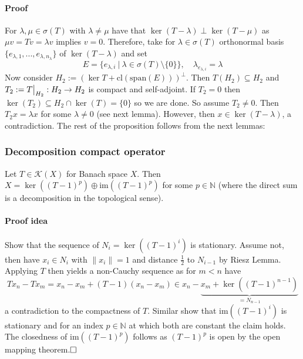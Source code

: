 \documentclass{scrartcl}
\newcommand{\N}{\mathbb{N}}
\newcommand\restr[2]{{
    \left.\kern-\nulldelimiterspace
    #1
    \vphantom{\big|}
    \right|_{#2}
}}
\begin{document}
\paragraph{Proof} For $\lambda, \mu \in \sigma(T)$ with $\lambda \neq \mu$ have that $\ker(T - \lambda) \perp \ker(T - \mu)$ as $\mu v = T v = \lambda v$ implies $v = 0$. Therefore, take for $\lambda \in \sigma(T)$ orthonormal basis $\{ e_{\lambda, 1}, ..., e_{\lambda, n_\lambda} \}$ of $\ker(T - \lambda)$ and set
\begin{equation*}
    E = \{ e_{\lambda, i} \ | \ \lambda \in \sigma(T) \setminus \{0\} \}, \quad \lambda_{e_{\lambda, i}} = \lambda
\end{equation*}
Now consider $H_2 := (\ker T + \mathrm{cl}(\mathrm{span}(E)))^\perp$. Then $T(H_2) \subseteq H_2$ and $T_2 := \restr{T}{H_2}: H_2 \to H_2$ is compact and self-adjoint. If $T_2 = 0$ then $\ker(T_2) \subseteq H_2 \cap \ker(T) = \{0\}$ so we are done. 
So assume $T_2 \neq 0$. Then $T_2x = \lambda x$ for some $\lambda \neq 0$ (see next lemma). However, then $x \in \ker(T - \lambda)$, a contradiction.
The rest of the proposition follows from the next lemmas:

\subsubsection{Decomposition compact operator}
\label{decomposition_compact_operator}
Let $T \in \mathcal{K}(X)$ for Banach space $X$. Then $X = \ker((T - 1)^p) \oplus \mathrm{im}((T - 1)^p)$ for some $p \in \N$ (where the direct sum is a decomposition in the topological sense).
\paragraph{Proof idea} Show that the sequence of $N_i = \ker((T - 1)^i)$ is stationary. Assume not, then have $x_i \in N_i$ with $\|x_i\| = 1$ and distance $\frac 1 2$ to $N_{i - 1}$ by Riesz Lemma. Applying $T$ then yields a non-Cauchy sequence as for $m < n$ have
\begin{equation*}
    Tx_n - Tx_m = x_n - x_m + (T - 1)(x_n - x_m) \in x_n - \underbrace{x_m + \ker((T - 1)^{n - 1})}_{= N_{n - 1}}
\end{equation*}
a contradiction to the compactness of $T$. Similar show that $\mathrm{im}((T - 1)^i)$ is stationary and for an index $p \in \N$ at which both are constant the claim holds. The closedness of $\mathrm{im}((T - 1)^p)$ follows as $(T - 1)^p$ is open by the open mapping theorem.$\hfill\square$
\end{document}
